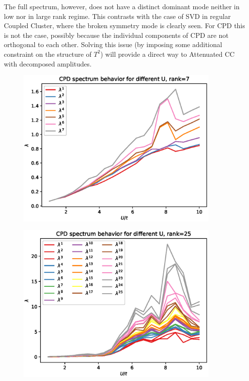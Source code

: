 \documentclass[a4paper,10pt]{article}
\begin{document}
The full spectrum, however, does not have a distinct dominant mode
neither in low nor in large rank regime. This contrasts with the case of SVD in 
regular Coupled Cluster, where the broken symmetry mode is clearly seen.
For CPD this is not the case, possibly because the individual 
components of CPD are not orthogonal to each other. Solving this issue (by imposing some 
additional constraint on the structure of $T^2$) will provide a direct way to 
Attenuated CC with decomposed amplitudes.

\begin{figure}[!htb]
\centering
\includegraphics[width=0.9\textwidth]{figures/lam1_lamN_vs_u_10_sites_rank_7.eps}
\end{figure}

\begin{figure}[!htb]
\centering
\includegraphics[width=0.9\textwidth]{figures/lam1_lamN_vs_u_10_sites_rank_25.eps}
\end{figure}
\end{document}
